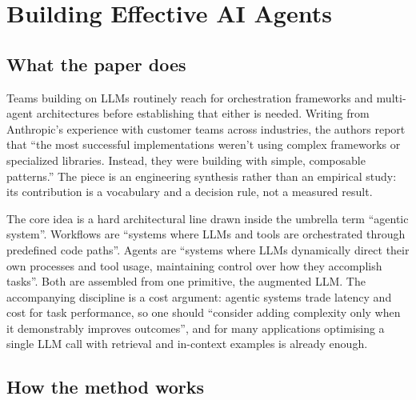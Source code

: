 \section{Building Effective AI Agents}

\subsection{What the paper does}

Teams building on LLMs routinely reach for orchestration frameworks and multi-agent architectures before establishing that either is needed. Writing from Anthropic's experience with customer teams across industries, the authors report that ``the most successful implementations weren't using complex frameworks or specialized libraries. Instead, they were building with simple, composable patterns.'' The piece is an engineering synthesis rather than an empirical study: its contribution is a vocabulary and a decision rule, not a measured result.

The core idea is a hard architectural line drawn inside the umbrella term ``agentic system''. Workflows are ``systems where LLMs and tools are orchestrated through predefined code paths''. Agents are ``systems where LLMs dynamically direct their own processes and tool usage, maintaining control over how they accomplish tasks''. Both are assembled from one primitive, the augmented LLM. The accompanying discipline is a cost argument: agentic systems trade latency and cost for task performance, so one should ``consider adding complexity only when it demonstrably improves outcomes'', and for many applications optimising a single LLM call with retrieval and in-context examples is already enough.

\subsection{How the method works}

